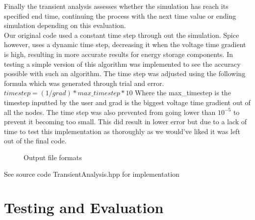 \documentclass{article}
\begin{document}
Finally the transient analysis assesses whether the simulation has reach its specified end time, continuing the process with the next time value or ending simulation depending on this evaluation.\\ 
Our original code used a constant time step through out the simulation. Spice however, uses a dynamic time step, decreasing it when the voltage time gradient is high, resulting in more accurate results for energy storage components. In testing a simple version of this algorithm was implemented to see the accuracy possible with such an algorithm. The time step was adjusted using the following formula which was generated through trial and error. \bigbreak
$timestep = (1/grad) * max\_timestep * 10$\bigbreak
Where the max\_timestep is the timestep inputted by the user and grad is the biggest voltage time gradient out of all the nodes. The time step was also prevented from going lower than $10^{-5}$ to prevent it becoming too small. This did result in lower error but due to a lack of time to test this implementation as thoroughly as we would've liked it was left out of the final code. 

\begin{figure}[h]%
    \centering
    \qquad
    \caption{Output file formats}%
    \label{fig:CalculateCurrent}%
\end{figure}



\bigbreak
See source code TransientAnalysis.hpp for implementation


\newpage
\section{Testing and Evaluation}
\end{document}
